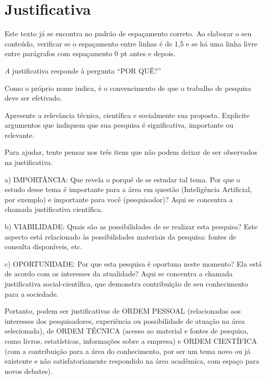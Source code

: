 \section{Justificativa}

Este texto já se encontra no padrão de espaçamento correto. Ao elaborar o seu conteúdo, verificar se o espaçamento entre linhas é de 1,5 e se há uma linha livre entre parágrafos com espaçamento 0 pt antes e depois. 
\cite{conceiccao2015comunicaccao}

\textit
A justificativa responde à pergunta “POR QUÊ?” 

Como o próprio nome indica, é o convencimento de que o trabalho de pesquisa deve ser efetivado.  

Apresente a relevância técnica, científica e socialmente sua proposta. Explicite argumentos que indiquem que sua pesquisa é significativa, importante ou relevante.  

Para ajudar, tente pensar nos três itens que não podem deixar de ser observados na justificativa. 

a) IMPORTÂNCIA: Que revela o porquê de se estudar tal tema. Por que o estudo desse tema é importante para a área em questão (Inteligência Artificial, por exemplo) e importante para você (pesquisador)? Aqui se concentra a chamada justificativa científica.  

b) VIABILIDADE: Quais são as possibilidades de se realizar esta pesquisa? Este aspecto está relacionado às possibilidades materiais da pesquisa: fontes de consulta disponíveis, etc. 

c) OPORTUNIDADE: Por que esta pesquisa é oportuna neste momento? Ela está de acordo com os interesses da atualidade? Aqui se concentra a chamada justificativa social-científica, que demonstra contribuição de seu conhecimento para a sociedade. 

Portanto, podem ser justificativas de ORDEM PESSOAL (relacionadas aos interesses dos pesquisadores, experiência ou possibilidade de atuação na área selecionada), de ORDEM TÉCNICA (acesso ao material e fontes de pesquisa, como livros, estatísticas, informações sobre a empresa) e ORDEM CIENTÍFICA (com a contribuição para a área do conhecimento, por ser um tema novo ou já existente e não satisfatoriamente respondido na área acadêmica, com espaço para novos debates). 
